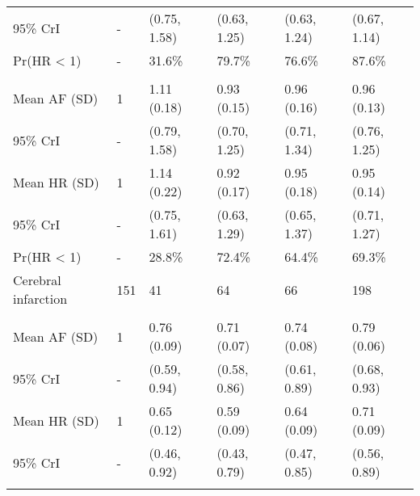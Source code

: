 \documentclass[nutrients,article,accept,moreauthors,pdftex]{Definitions/mdpi}
\begin{document}
\begin{table}[H]
{\begin{tabular}{L{32mm}C{8mm}C{26mm}C{25mm}C{25mm}C{20mm}}
\hspace{1em}95\% CrI & - & (0.75, 1.58) & (0.63, 1.25) & (0.63, 1.24) & (0.67, 1.14)\\
   \hspace{1em}Pr(HR < 1) & - & 31.6\% & 79.7\% & 76.6\% & 87.6\%\\
\addlinespace[0.3em]
\\
\hspace{1em}Mean AF (SD) & 1 & 1.11 (0.18) & 0.93 (0.15) & 0.96 (0.16) & 0.96 (0.13)\\
   \hspace{1em}95\% CrI & - & (0.79, 1.58) & (0.70, 1.25) & (0.71, 1.34) & (0.76, 1.25)\\
\hspace{1em}Mean HR (SD) & 1 & 1.14 (0.22) & 0.92 (0.17) & 0.95 (0.18) & 0.95 (0.14)\\
   \hspace{1em}95\% CrI & - & (0.75, 1.61) & (0.63, 1.29) & (0.65, 1.37) & (0.71, 1.27)\\
\hspace{1em}Pr(HR < 1) & - & 28.8\% & 72.4\% & 64.4\% & 69.3\%\\
\hline
   Cerebral infarction & 151 & 41 & 64 & 66 & 198\\
\addlinespace[0.3em]
\\
\hspace{1em}Mean AF (SD) & 1 & 0.76 (0.09) & 0.71 (0.07) & 0.74 (0.08) & 0.79 (0.06)\\
   \hspace{1em}95\% CrI & - & (0.59, 0.94) & (0.58, 0.86) & (0.61, 0.89) & (0.68, 0.93)\\
\hspace{1em}Mean HR (SD) & 1 & 0.65 (0.12) & 0.59 (0.09) & 0.64 (0.09) & 0.71 (0.09)\\
   \hspace{1em}95\% CrI & - & (0.46, 0.92) & (0.43, 0.79) & (0.47, 0.85) & (0.56, 0.89)\\


\end{tabular}}


\end{table}
\unskip
\end{document}
